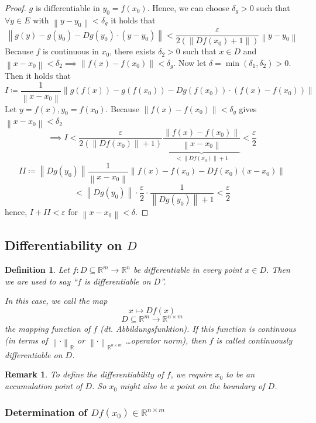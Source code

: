 \documentclass{article}
\newtheorem{definition}{Definition}  \numberwithin{definition}{section}
\newtheorem{remark}{Remark}  \numberwithin{remark}{section}
\newcommand{\norm}[1]{\left\|#1\right\|}
\begin{document}
\begin{proof}
  $g$ is differentiable in $y_0 = f(x_0)$. Hence, we can choose $\delta_g > 0$ such that $\forall y \in E$ with $\norm{y - y_0} < \delta_g$
  it holds that
  \[ \norm{g(y) - g(y_0) - Dg(y_0) \cdot (y - y_0)} < \frac{\varepsilon}{2 \left(\norm{Df(x_0) + 1}\right)} \norm{y - y_0} \]
  Because $f$ is continuous in $x_0$, there exists $\delta_2 > 0$ such that $x \in D$ and $\norm{x - x_0} < \delta_2 \implies \norm{f(x) - f(x_0)} < \delta_g$.
  Now let $\delta = \min(\delta_1, \delta_2) > 0$. Then it holds that
  \[ I \coloneqq \frac{1}{\norm{x - x_0}} \norm{g(f(x)) - g(f(x_0)) - Dg(f(x_0)) \cdot (f(x) - f(x_0))} \]
  Let $y = f(x), y_0 = f(x_0)$.
  Because $\norm{f(x) - f(x_0)} < \delta_g$ gives $\norm{x - x_0} < \delta_2$
  \[ \implies I < \frac{\varepsilon}{2 \left(\norm{Df(x_0)} + 1\right)} \underbrace{\frac{\norm{f(x) - f(x_0)}}{\norm{x - x_0}}}_{< \norm{Df(x_0)} + 1} < \frac\varepsilon2 \]
  \[ II \coloneqq \norm{Dg(y_0)} \frac{1}{\norm{x - x_0}} \norm{f(x) - f(x_0) - Df(x_0) (x - x_0)} \]
  \[ < \norm{Dg(y_0)} \cdot \frac{\varepsilon}{2} \cdot \frac{1}{\norm{Dg(y_0)} + 1} < \frac\varepsilon2 \]
  hence, $I + II < \varepsilon$ for $\norm{x - x_0} < \delta$.
\end{proof}

\subsection{Differentiability on $D$}
\begin{definition}
  Let $f: D \subseteq \mathbb R^m \to \mathbb R^n$ be differentiable in every point $x \in D$.
  Then we are used to say \enquote{$f$ is differentiable \emph{on} $D$}.

  In this case, we call the map
  \[ x \mapsto Df(x) \]
  \[ D \subseteq \mathbb R^m \to \mathbb R^{n \times m} \]
  the mapping function of $f$ (dt. \foreignlanguage{german}{Abbildungsfunktion}).
  If this function is continuous (in terms of $\norm{\cdot}_{\mathbb R}$ or $\norm{\cdot}_{\mathbb R^{n \times m}}$ \dots operator norm),
  then $f$ is called continuously differentiable on $D$.
\end{definition}

\begin{remark}
  To define the differentiability of $f$, we require $x_0$ to be an accumulation point of $D$.
  So $x_0$ might also be a point on the boundary of $D$.
\end{remark}

\subsubsection{Determination of $Df(x_0) \in \mathbb R^{n \times m}$}
\end{document}
